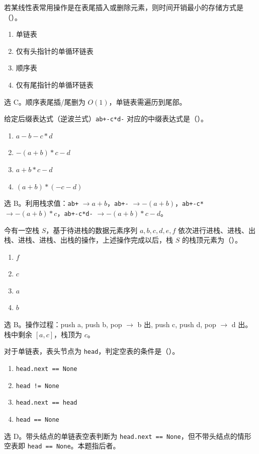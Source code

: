 \begin{question}
若某线性表常用操作是在表尾插入或删除元素，则时间开销最小的存储方式是（\quad）。
\begin{enumerate}
  \item 单链表
  \item 仅有头指针的单循环链表
  \item 顺序表
  \item 仅有尾指针的单循环链表
\end{enumerate}
\begin{solution}
选 C。顺序表尾插/尾删为 $O(1)$，单链表需遍历到尾部。
\end{solution}
\end{question}

\begin{question}
给定后缀表达式（逆波兰式）\texttt{ab+-c*d-} 对应的中缀表达式是（\quad）。
\begin{enumerate}
  \item $a-b-c*d$
  \item $-(a+b)*c-d$
  \item $a+b*c-d$
  \item $(a+b)*(-c-d)$
\end{enumerate}
\begin{solution}
选 B。利用栈求值：\texttt{ab+} $\to a+b$，\texttt{ab+-} $\to -(a+b)$，\texttt{ab+-c*} $\to -(a+b)*c$，\texttt{ab+-c*d-} $\to -(a+b)*c-d$。
\end{solution}
\end{question}

\begin{question}
今有一空栈 $S$，基于待进栈的数据元素序列 $a,b,c,d,e,f$ 依次进行进栈、进栈、出栈、进栈、进栈、出栈的操作，上述操作完成以后，栈 $S$ 的栈顶元素为（\quad）。
\begin{enumerate}
  \item $f$
  \item $c$
  \item $a$
  \item $b$
\end{enumerate}
\begin{solution}
选 B。操作过程：push a, push b, pop $\to$ b 出, push c, push d, pop $\to$ d 出。栈中剩余 $[a,c]$，栈顶为 $c$。
\end{solution}
\end{question}

\begin{question}
对于单链表，表头节点为 \texttt{head}，判定空表的条件是（\quad）。
\begin{enumerate}
  \item \texttt{head.next == None}
  \item \texttt{head != None}
  \item \texttt{head.next == head}
  \item \texttt{head == None}
\end{enumerate}
\begin{solution}
选 D。带头结点的单链表空表判断为 \texttt{head.next == None}，但不带头结点的情形空表即 \texttt{head == None}。本题指后者。
\end{solution}
\end{question}

